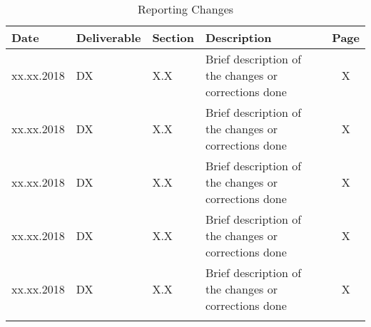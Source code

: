 \begin{longtable}[H]{l l l p{7cm} c}
	
	\toprule[2pt]
	
	\textbf{Date} & \textbf{Deliverable} & \textbf{Section} &  \textbf{Description} & \textbf{Page} \\
	
	\midrule[1.5pt] 
	\endhead
	
	xx.xx.2018 & DX & X.X  & Brief description of the changes or corrections done & X \vspace{0.2cm} \\
	
	\midrule

	xx.xx.2018 & DX & X.X  & Brief description of the changes or corrections done & X \vspace{0.2cm} \\
	
	\midrule

	xx.xx.2018 & DX & X.X  & Brief description of the changes or corrections done & X \vspace{0.2cm} \\
	
	\midrule

	xx.xx.2018 & DX & X.X  & Brief description of the changes or corrections done & X \vspace{0.2cm} \\
	
	\midrule
		
	xx.xx.2018 & DX & X.X  & Brief description of the changes or corrections done & X \vspace{0.2cm} \\
	
	\bottomrule[2pt]
	
	\caption{Reporting Changes}
\end{longtable}

